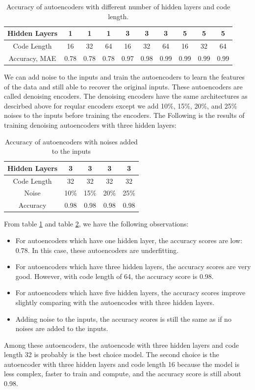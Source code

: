 \documentclass{article}
\begin{document}
\begin{table} [h!]
\centering
\begin{tabular}{c|c|c|c|c|c|c|c|c|c}
	Hidden Layers & 1 & 1 & 1 & 3 & 3 & 3 & 5 & 5 & 5 \\
	\hline
	Code Length & 16 & 32 & 64 & 16 & 32 & 64 & 16 & 32 & 64 \\
	\hline
	Accuracy, MAE & 0.78 & 0.78 & 0.78 & 0.97 & 0.98 & 0.99 & 0.99 & 0.99 & 0.99
\end{tabular}
\caption{Accuracy of autoencoders with different number of hidden layers and code length.}
\label{table:ae}
\end{table}
We can add noise to the inputs and train the autoencoders to learn the features of the data and still able to recover the original inputs. These autoencoders are called denoising encoders. The denoising encoders have the same architectures as descirbed above for reqular encoders except we add 10\%, 15\%, 20\%, and 25\% noises to the inputs before training the encoders. The  Following is the results of training  denoising autoencoders with three hidden layers: 
\begin{table} [h!]
\centering
\begin{tabular}{c|c|c|c|c}
	Hidden Layers & 3 & 3 & 3 & 3 \\
	\hline 
	Code Length & 32 & 32 & 32 & 32 \\
	\hline
	Noise & 10\% & 15\% & 20\% & 25\% \\ 
	\hline
	Accuracy & 0.98 & 0.98 & 0.98 & 0.98
\end{tabular}
\caption{Accuracy of autoencoders with noises added to the inputs}
\label{table:ae_noise}
\end{table}

\noindent From table \ref{table:ae} and table \ref{table:ae_noise}, we have the following observations:
\begin{itemize}
	\item For autoencoders which have one hidden layer, the accuracy scores are low: 0.78. In this case, these autoencoders are underfitting.
	\item For autoencoders which have three hidden layers, the accuracy scores are very good. However, with code length of 64, the accuracy score is 0.98.
	\item For autoencoders which have five hidden layers, the accuracy scores improve slightly comparing with the autoencodes with three hidden layers.
	\item Adding noise to the inputs, the accuracy scores is still the same as if no noises are added to the inputs.  
\end{itemize}
Among these autoencoders, the autoencode with three hidden layers and code length 32 is probably is the best choice model. The second choice is the autoencoder with three hidden layers and code length 16 because the model is less complex, faster to train and compute, and the accuracy score is still about 0.98.
\end{document}
